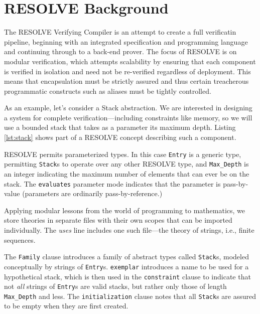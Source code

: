 \section{RESOLVE Background}\label{sec:resolveBackground}
The RESOLVE\cite{RESOLVE} Verifying Compiler is an attempt to create a full verificatin pipeline, beginning with an integrated specification and programming language and continuing through to a back-end prover.  The focus of RESOLVE is on modular verification, which attempts scalability by ensuring that each component is verified in isolation and need not be re-verified regardless of deployment.  This means that encapsulation must be strictly assured and thus certain treacherous programmatic constructs such as aliases must be tightly controlled.

As an example, let's consider a Stack abstraction.  We are interested in designing a system for complete verification---including constraints like memory, so we will use a bounded stack that takes as a parameter its maximum depth.  Listing \ref{lst:stack} shows part of a RESOLVE concept describing such a component.



RESOLVE permits parameterized types.  In this case \texttt{Entry} is a generic type, permitting \texttt{Stack}s to operate over any other RESOLVE type, and \texttt{Max\_Depth} is an integer indicating the maximum number of elements that can ever be on the stack.  The \texttt{evaluates} parameter mode indicates that the parameter is pass-by-value (parameters are ordinarily pass-by-reference.)

Applying modular lessons from the world of programming to mathematics, we store theories in separate files with their own scopes that can be imported individually\cite{smith08}.  The \emph{uses} line includes one such file---the theory of strings, i.e., finite sequences.

The \texttt{Family} clause introduces a family of abstract types called \texttt{Stack}s, modeled conceptually by strings of \texttt{Entry}s.  \texttt{exemplar} introduces a name to be used for a hypothetical stack, which is then used in the \texttt{constraint} clause to indicate that not \emph{all} strings of \texttt{Entry}s are valid stacks, but rather only those of length \texttt{Max\_Depth} and less.  The \texttt{initialization} clause notes that all \texttt{Stack}s are assured to be empty when they are first created.

